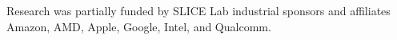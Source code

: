 \documentclass[sigplan,review,nonacm]{acmart}
\begin{document}








\begin{acks}
Research was partially funded by SLICE Lab industrial sponsors and affiliates Amazon, AMD, Apple, Google, Intel, and Qualcomm.
\end{acks}




\end{document}
